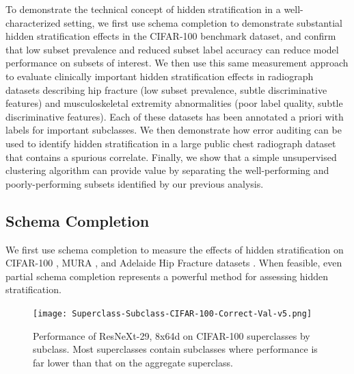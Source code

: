 \documentclass{article}
\begin{document}
To demonstrate the technical concept of hidden stratification in a well-characterized setting, we first use schema completion to demonstrate substantial hidden stratification effects in the CIFAR-100 benchmark dataset, and confirm that low subset prevalence and reduced subset label accuracy can reduce model performance on subsets of interest.
We then use this same measurement approach to evaluate clinically important hidden stratification effects in radiograph datasets describing hip fracture (low subset prevalence, subtle discriminative features) and musculoskeletal extremity abnormalities (poor label quality, subtle discriminative features).
Each of these datasets has been annotated a priori with labels for important subclasses.
We then demonstrate how error auditing can be used to identify hidden stratification in a large public chest radiograph dataset that contains a spurious correlate.
Finally, we show that a simple unsupervised clustering algorithm can provide value by separating the well-performing and poorly-performing subsets identified by our previous analysis.

\subsection{Schema Completion}

We first use schema completion to measure the effects of hidden stratification on CIFAR-100 \citep{Krizhevsky2009-tq}, MURA \citep{Rajpurkar2017-rc}, and Adelaide Hip Fracture datasets \citep{Gale_W_Oakden-Rayner_L_Carneiro_G_Bradley_AP_Palmer_LJ2017-tl}.
When feasible, even partial schema completion represents a powerful method for assessing hidden stratification.

 \begin{figure}[htb!]
 \centering
 \vspace{-2mm}
\texttt{[image: Superclass-Subclass-CIFAR-100-Correct-Val-v5.png]}
\caption{Performance of ResNeXt-29, 8x64d on CIFAR-100 superclasses by subclass.  Most superclasses contain subclasses where performance is far lower than that on the aggregate superclass.}
\label{fig:cifar}
\vspace{-3mm}
\end{figure}
\end{document}
